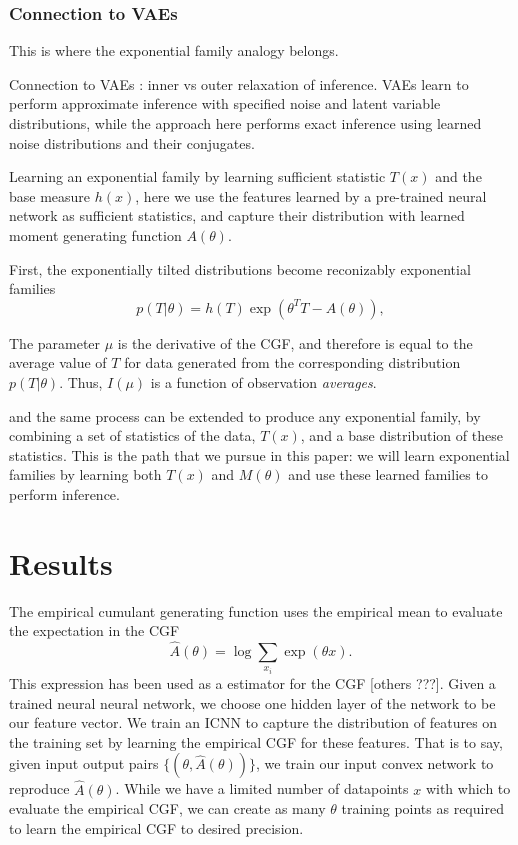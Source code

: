 \documentclass[10pt]{article}      %
\begin{document}
\subsubsection{Connection to VAEs}
This is where the exponential family analogy belongs.


Connection to VAEs \cite{kingma_auto-encoding_2013}: inner vs outer relaxation of inference.
VAEs learn to perform approximate inference with specified noise and latent variable distributions, while the approach here performs exact inference using learned noise distributions and their conjugates. 




Learning an exponential family by learning sufficient statistic $T(x)$ and the base measure $h(x)$, here we use the features learned by a pre-trained neural network as sufficient statistics, and capture their distribution with learned moment generating function $A(\theta)$.


First, the exponentially tilted distributions become reconizably exponential families
\begin{equation}
  p(T | \theta) = h(T) \exp( \theta^T T - A(\theta) ),
\end{equation}



The parameter $\mu$ is the derivative of the CGF, and therefore is equal to the average value of $T$ for data generated from the corresponding distribution $p(T|\theta)$.
Thus, $I(\mu)$ is a function of observation \textit{averages}.

and the same process can be extended to produce any exponential family, by combining a set of statistics of the data, $T(x)$, and a base distribution of these statistics.
This is the path that we pursue in this paper: we will learn exponential families by learning both $T(x)$ and $M(\theta)$ and use these learned families to perform inference.





\section{Results}


The empirical cumulant generating function uses the empirical mean to evaluate the expectation in the CGF
\begin{equation}
  \hat A(\theta) = \log \sum_{x_i} \exp(\theta x).
\end{equation}
This expression has been used as a estimator for the CGF \cite{duffield_entropy_1995} [others ???]. 
Given a trained neural neural network, we choose one hidden layer of the network to be our feature vector.
We train an ICNN to capture the distribution of features on the training set by learning the empirical CGF for these features.
That is to say, given input output pairs $\{ (\theta, \hat A(\theta) ) \}$, we train our input convex network to reproduce $\hat A(\theta)$.
While we have a limited number of datapoints $x$ with which to evaluate the empirical CGF, we can create as many $\theta$ training points as required to learn the empirical CGF to desired precision.
\end{document}
